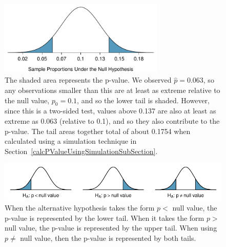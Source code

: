 \begin{figure}[ht]
\centering
\includegraphics[width=0.7\textwidth]{ch_foundations_for_inf/figures/MedicalConsultant/MedConsNullNormal}
\caption{The shaded area represents the p-value. We observed $\hat{p} = 0.063$, so any observations smaller than this are at least as extreme relative to the null value, $p_0 = 0.1$, and so the lower tail is shaded. However, since this is a two-sided test, values above 0.137 are also at least as extreme as 0.063 (relative to 0.1), and so they also contribute to the p-value. The tail areas together total of about 0.1754 when calculated using a simulation technique in Section~\ref{calcPValueUsingSimulationSubSection}.}
\label{MedConsNullNormal}
\end{figure}

\begin{figure}[ht]
\centering
\includegraphics[width=\textwidth]{ch_foundations_for_inf/figures/sidedness/sidedness_example_figures}
\caption{When the alternative hypothesis takes the form $p <$ null value, the p-value is represented by the lower tail. When it takes the form $p >$ null value, the p-value is represented by the upper tail. When using $p \neq$ null value, then the p-value is represented by both tails.}
\label{sidedness_example_figures}
\end{figure}


